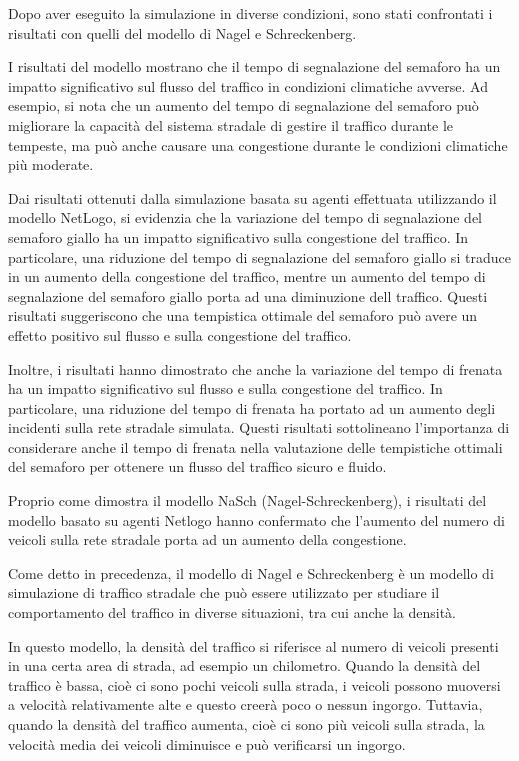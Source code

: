 \documentclass[11pt]{article}
\begin{document}
Dopo aver eseguito la simulazione in diverse condizioni, sono stati confrontati i risultati con quelli del modello di Nagel e Schreckenberg.

I risultati del modello mostrano che il tempo di segnalazione del semaforo ha un impatto significativo sul flusso del traffico in condizioni climatiche avverse. Ad esempio, si nota che un aumento del tempo di segnalazione del semaforo può migliorare la capacità del sistema stradale di gestire il traffico durante le tempeste, ma può anche causare una congestione durante le condizioni climatiche più moderate.

Dai risultati ottenuti dalla simulazione basata su agenti effettuata utilizzando il modello NetLogo, si evidenzia che la variazione del tempo di segnalazione del semaforo giallo ha un impatto significativo sulla congestione del traffico. In particolare, una riduzione del tempo di segnalazione del semaforo giallo si traduce in un aumento della congestione del traffico, mentre un aumento del tempo di segnalazione del semaforo giallo porta ad una diminuzione dell traffico. Questi risultati suggeriscono che una tempistica ottimale del semaforo può avere un effetto positivo sul flusso e sulla congestione del traffico.

Inoltre, i risultati hanno dimostrato che anche la variazione del tempo di frenata ha un impatto significativo sul flusso e sulla congestione del traffico. In particolare, una riduzione del tempo di frenata ha portato ad un aumento degli incidenti sulla rete stradale simulata. Questi risultati sottolineano l'importanza di considerare anche il tempo di frenata nella valutazione delle tempistiche ottimali del semaforo per ottenere un flusso del traffico sicuro e fluido.

Proprio come dimostra il modello NaSch (Nagel-Schreckenberg), i risultati del modello basato su agenti Netlogo hanno confermato che l'aumento del numero di veicoli sulla rete stradale porta ad un aumento della congestione.

Come detto in precedenza, il modello di Nagel e Schreckenberg è un modello di simulazione di traffico stradale che può essere utilizzato per studiare il comportamento del traffico in diverse situazioni, tra cui anche la densità.

In questo modello, la densità del traffico si riferisce al numero di veicoli presenti in una certa area di strada, ad esempio un chilometro. Quando la densità del traffico è bassa, cioè ci sono pochi veicoli sulla strada, i veicoli possono muoversi a velocità relativamente alte e questo creerà poco o nessun ingorgo. Tuttavia, quando la densità del traffico aumenta, cioè ci sono più veicoli sulla strada, la velocità media dei veicoli diminuisce e può verificarsi un ingorgo. 
\end{document}
